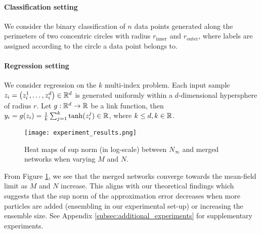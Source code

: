 \paragraph{Classification setting} We consider the binary classification of $n$ data points generated along the perimeters of two concentric circles with radius $r_\text{inner}$ and $r_\text{outer}$, where labels are assigned according to the circle a data point belongs to. 

\paragraph{Regression setting} We consider regression on the $k$ multi-index problem. Each input sample $z_i = \left(z_i^1, \dots, z_i^d \right)\in \mathbb{R}^d$ is generated uniformly within a $d$-dimensional hypersphere of radius $r$. Let $g: \mathbb{R}^d \rightarrow \mathbb{R}$ be a link function, then $y_i = g(z_i) = \frac{1}{k}\sum^k_{j=1} \tanh (z_i^j) \in \mathbb{R}$, where $k \leq d, k \in \mathbb{R}$.

\begin{figure}[ht]
\vskip 0.2in
\begin{center}
\centerline{\texttt{[image: experiment\_results.png]}}
\caption{Heat maps of sup norm (in log-scale) between $N_\infty$ and merged networks when varying $M$ and $N$.}  %
\label{fig:experiments_regression}
\end{center}
\vskip -0.2in
\end{figure}

From Figure \ref{fig:experiments_regression}, we see that the merged networks converge towards the mean-field limit as $M$ and $N$ increase. This aligns with our theoretical findings which suggests that the sup norm of the approximation error decreases when more particles are added (ensembling in our experimental set-up) or increasing the ensemble size. See Appendix \ref{subsec:additional_experiments} for supplementary experiments.

